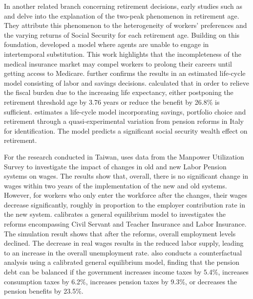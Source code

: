 \documentclass[12pt]{article}
\begin{document}
\begin{CJK*}{UTF8}{bsmi}
In another related branch concerning retirement decisions, 
early studies such as \cite{burtless1986} and 
\cite{gustman1986} delve into the explanation of the two-peak 
phenomenon in retirement age. They attribute this phenomenon 
to the heterogeneity of workers' preferences and the varying 
returns of Social Security for each retirement age. Building 
on this foundation, \cite{rust1997} developed a model where 
agents are unable to engage in intertemporal substitution. 
This work highlights that the incompleteness of the medical 
insurance market may compel workers to prolong their careers 
until getting access to Medicare. \cite{french2011} further 
confirms the results in an estimated life-cycle model 
consisting of labor and savings decisions. \cite{haan2014} 
calculated that in order to relieve the fiscal burden due to 
the increasing life expectancy, either postponing the 
retirement threshold age by 3.76 years or reduce the benefit 
by 26.8\% is sufficient. \cite{daminato2023} estimates a 
life-cycle model incorporating savings, portfolio choice 
and retirement through a quasi-experimental variation from 
pension reforms in Italy for identification. The model 
predicts a significant social security wealth effect on 
retirement. 

For the research conducted in Taiwan, \cite{yang2009} uses 
data from the Manpower Utilization Survey to investigate the 
impact of changes in old and new Labor Pension systems on 
wages. The results show that, overall, there is no 
significant change in wages within two years of the 
implementation of the new and old systems. However, for 
workers who only enter the workforce after the changes, 
their wages decrease significantly, roughly in proportion to 
the employer contribution rate in the new system. 
\cite{reform2017} calibrates a general equilibrium model to 
investigates the reforms encompassing Civil Servant and 
Teacher Insurance and Labor Insurance. The simulation result 
shows that after the reforms, overall employment levels 
declined. The decrease in real wages results in the reduced 
labor supply, leading to an increase in the overall 
unemployment rate. \cite{cheng2020} also conducts a 
counterfactual analysis using a calibrated general 
equilibrium model, finding that the pension debt can be 
balanced if the government increases income taxes by 5.4\%, 
increases consumption taxes by 6.2\%, increases pension taxes 
by 9.3\%, or decreases the pension benefits by 23.5\%.


\end{CJK*}
\end{document}
